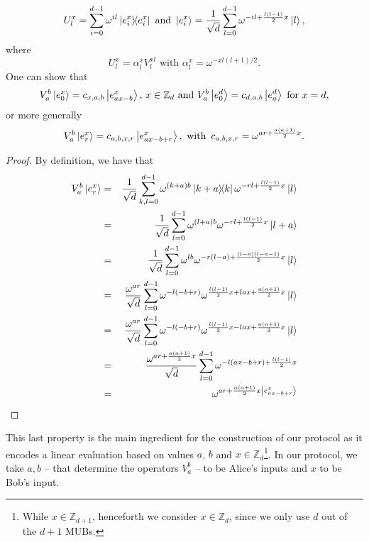 \begin{equation*}
    U^x_l = \sum^{d-1}_{i=0} \omega^{i l} \ketbra{e^x_i}{e^x_i} \text{ and }\ket{e^x_i} = \frac{1}{\sqrt{d}} \sum^{d-1}_{l=0} \omega^{- i l + \frac{l(l-1)}{2}x}\ket{l},
\end{equation*}
where
\begin{equation*}
    U^x_l = \alpha^x_l V^{x l}_l \text{ with }\alpha^x_l = \omega^{-x l(l+1)/2}.
\end{equation*}
One can show that
\begin{equation*}
  V^b_a \ket{e^x_0} = c_{x,a,b} \ket{e^x_{ax - b}},\, x\in\mathbb{Z}_d  \text{ and }
V^b_a \ket{e^d_0} = c_{d,a,b} \ket{e^d_a} {\text{ for } x=d},\end{equation*}
or more generally
\begin{equation}
    V^b_a \ket{e^x_r} = c_{a, b, x, r} \ket{e^x_{ax - b + r}}, \text{ with }\, c_{a, b, x, r} = \omega^{ar + \frac{a(a+1)}{2}x}. \label{eq:main_relation}
\end{equation}
\begin{proof}
By definition, we have that
\begin{eqnarray*}
V^b_a \ket{e^x_r} &=& \frac{1}{\sqrt{d}} \sum_{k,l = 0}^{d-1} \omega^{(k+a)b}\ketbra{k+a}{k} \omega^{-rl + \frac{l(l-1)}{2}x} \ket{l}\\
&=&  \frac{1}{\sqrt{d}} \sum_{l = 0}^{d-1} \omega^{(l+a)b} \omega^{-rl + \frac{l(l-1)}{2}x} \ket{l+a}\\
&=&  \frac{1}{\sqrt{d}} \sum_{l = 0}^{d-1} \omega^{lb}\omega^{-r(l-a) + \frac{(l-a)(l-a-1)}{2}x} \ket{l} \\
&=&  \frac{\omega^{ar}}{\sqrt{d}} \sum_{l = 0}^{d-1} \omega^{-l(-b+r)}\omega^{ \frac{l(l-1)}{2}x + lax + \frac{a(a+1)}{2}x } \ket{l} \\
&=&  \frac{\omega^{ar}}{\sqrt{d}} \sum_{l = 0}^{d-1} \omega^{-l(-b+r)}\omega^{ \frac{l(l-1)}{2}x - lax + \frac{a(a+1)}{2}x } \ket{l} \\
&=&  \frac{\omega^{ar + \frac{a(a+1)}{2}x}}{\sqrt{d}} \sum_{l = 0}^{d-1} \omega^{-l(ax-b+r) + \frac{l(l-1)}{2}x}\\
&=& \omega^{ar + \frac{a(a+1)}{2}x \ket{e^x_{ax - b + r}}}
\end{eqnarray*}
\end{proof}
This last property is the main ingredient for the construction of our protocol as it encodes a linear evaluation based on values $a$, $b$ and $x \in \mathbb{Z}_d$\footnote{While $x \in \mathbb{Z}_{d+1}$, henceforth we consider $x \in \mathbb{Z}_{d}$, since we only use $d $ out of the $d+1$ MUBs.}. In our protocol, we take $a,b$ -- that determine the operators $V^b_ a$ -- to be Alice's inputs and $x$ to be Bob's input.

